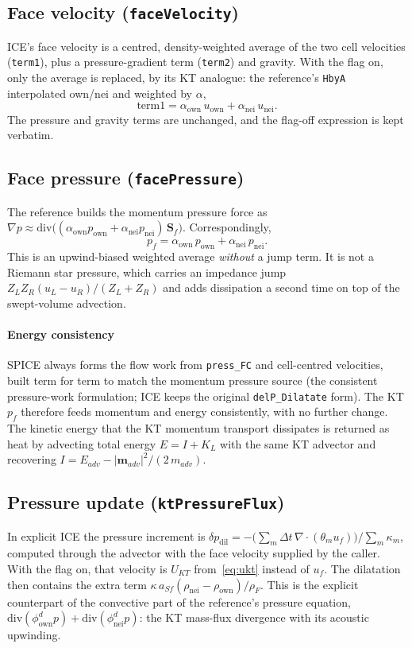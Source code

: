 \documentclass[11pt]{article}
\newcommand{\code}[1]{\texttt{\small #1}}
\newcommand{\own}{\mathrm{own}}
\newcommand{\nei}{\mathrm{nei}}
\newcommand{\dt}{\Delta t}
\begin{document}
\subsection{Face velocity (\code{faceVelocity})}
ICE's face velocity is a centred, density-weighted average of the two cell velocities
(\code{term1}), plus a pressure-gradient term (\code{term2}) and gravity. With the flag on,
only the average is replaced, by its KT analogue: the reference's \code{HbyA} interpolated
own/nei and weighted by $\alpha$,
\begin{equation}
  \text{term1} = \alpha_\own\,u_\own + \alpha_\nei\,u_\nei .
\end{equation}
The pressure and gravity terms are unchanged, and the flag-off expression is kept
verbatim.

\subsection{Face pressure (\code{facePressure})}
The reference builds the momentum pressure force as
$\nabla p \approx \mathrm{div}\bigl((\alpha_\own p_\own+\alpha_\nei p_\nei)\,\mathbf S_f\bigr)$.
Correspondingly,
\begin{equation}
  p_f = \alpha_\own\,p_\own + \alpha_\nei\,p_\nei .
\end{equation}
This is an upwind-biased weighted average \emph{without} a jump term. It is not a Riemann
star pressure, which carries an impedance jump $Z_LZ_R(u_L-u_R)/(Z_L+Z_R)$ and adds
dissipation a second time on top of the swept-volume advection.

\paragraph{Energy consistency}
SPICE always forms the flow work from \code{press\_FC} and cell-centred velocities, built
term for term to match the momentum pressure source (the consistent pressure-work formulation;
ICE keeps the original \code{delP\_Dilatate} form). The KT $p_f$ therefore feeds momentum and
energy consistently, with no further change. The kinetic energy that the KT momentum transport
dissipates is returned as heat by advecting total energy $E = I + K_L$ with the same KT
advector and recovering $I = E_{adv} - |\mathbf{m}_{adv}|^2/(2\,m_{adv})$.

\subsection{Pressure update (\code{ktPressureFlux})}
In explicit ICE the pressure increment is
$\delta p_{\mathrm{dil}} = -\bigl(\sum_m \dt\,\nabla\!\cdot(\theta_m u_f)\bigr)/\sum_m\kappa_m$,
computed through the advector with the face velocity supplied by the caller. With the flag
on, that velocity is $U_{KT}$ from~\eqref{eq:ukt} instead of $u_f$. The dilatation then
contains the extra term $\kappa\,a_{Sf}(\rho_\nei-\rho_\own)/\rho_F$. This is the explicit
counterpart of the convective part of the reference's pressure equation,
$\mathrm{div}(\phi^d_\own p)+\mathrm{div}(\phi^d_\nei p)$: the KT mass-flux divergence
with its acoustic upwinding.
\end{document}
